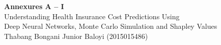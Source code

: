 \documentclass[12pt]{article}
\begin{document}
\begin{center}
{\LARGE \textbf{Annexures A -- I}}\\[12pt]
{\large Understanding Health Insurance Cost Predictions Using\\
Deep Neural Networks, Monte Carlo Simulation and Shapley Values}\\[8pt]
{\normalsize Thabang Bongani Junior Baloyi (2015015486)}
\end{center}

\vspace{10pt}
\tableofcontents
\clearpage



\clearpage


\clearpage


\clearpage


\clearpage


\clearpage


\clearpage


\clearpage


\clearpage

\end{document}
